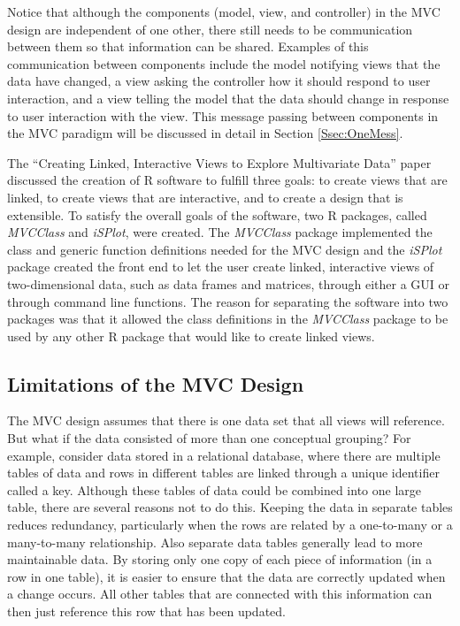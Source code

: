 \documentclass{article}[11pt]
\newcommand{\Rpackage}[1]{{\textit{#1}}}
\begin{document}
Notice that although the components (model, view, and controller) in the MVC
design are independent of one other, there still needs to be communication
between them so that information can be shared.  Examples of this
communication between components include the model notifying views that the
data have changed, a view asking the controller how it should respond to user
interaction, and a view telling the model that the data should change in
response to user interaction with the view.  This message passing between
components in the MVC paradigm will be discussed in detail in Section
\ref{Ssec:OneMess}.   

The ``Creating Linked, Interactive Views to Explore Multivariate Data''
\cite{EW05} paper discussed the creation of R software to fulfill three goals:
to create views that are linked, to create views that are interactive, and to
create a design that is extensible.  To satisfy the overall goals of the
software, two R packages, called \Rpackage{MVCClass} and \Rpackage{iSPlot},
were created.  The \Rpackage{MVCClass} package implemented the class and
generic function definitions needed for the MVC design and the
\Rpackage{iSPlot} package created the front end to let the user create linked,
interactive views of two-dimensional data, such as data frames and matrices,
through either a GUI or through command line functions.  The reason for
separating the software into two packages was that it allowed the class
definitions in the \Rpackage{MVCClass} package to be used by any other R
package that would like to create linked views. 

\subsection{Limitations of the MVC Design}\label{Ssec:Limit}

The MVC design assumes that there is one data set that all views will
reference.  But what if the data consisted of more than one conceptual
grouping?  For example, consider data stored in a relational database, where
there are multiple tables of data and rows in different tables are linked
through a unique identifier called a key.  Although these tables of data could
be combined into one large table, there are several reasons not to do this.
Keeping the data in separate tables reduces redundancy, particularly when the
rows are related by a one-to-many or a many-to-many relationship.  Also
separate data tables generally lead to more maintainable data.  By storing
only one copy of each piece of information (in a row in one table), it is
easier to ensure that the data are correctly updated when a change occurs.
All other tables that are connected with this information can then just
reference this row that has been updated. 
\end{document}
